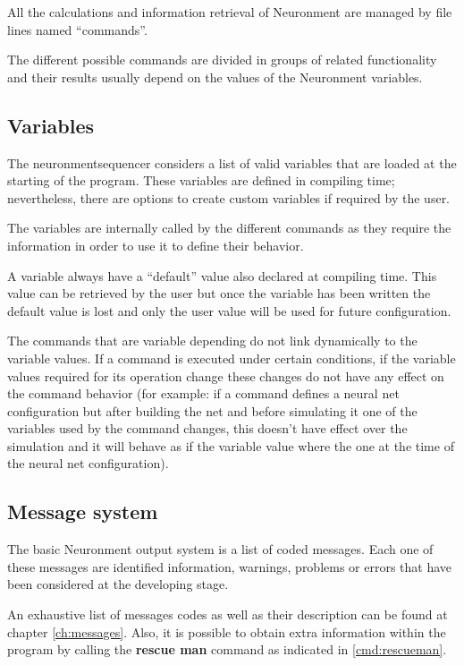 All the calculations and information retrieval of Neuronment are managed by  file lines named ``commands''.

The different possible commands are divided in groups of related functionality and their results usually depend on the values of the Neuronment variables.

\subsection{Variables}

The \gls{neuronmentsequencer} considers a list of valid variables that are loaded at the starting of the program. These variables are defined in compiling time; nevertheless, there are options to create custom variables if required by the user. \lotharpi

The variables are internally called by the different commands as they require the information in order to use it to define their behavior.

A variable always have a ``default'' value also declared at compiling time. This value can be retrieved by the user but once the variable has been written the default value is lost and only the user value will be used for future configuration.

The commands that are variable depending do not link dynamically to the variable values. If a command is executed under certain conditions, if the variable values required for its operation change these changes do not have any effect on the command behavior (for example: if a command defines a neural net configuration but after building the net and before simulating it one of the variables used by the command changes, this doesn't have effect over the simulation and it will behave as if the variable value where the one at the time of the neural net configuration).

\subsection{Message system}

The basic Neuronment output system is a list of coded messages. Each one of these messages are identified information, warnings, problems or errors that have been considered at the developing stage.

An exhaustive list of messages codes as well as their description can be found at chapter \ref{ch:messages}. Also, it is possible to obtain extra information within the program by calling the \textbf{rescue man} command as indicated in \ref{cmd:rescueman}. \lotharpi

